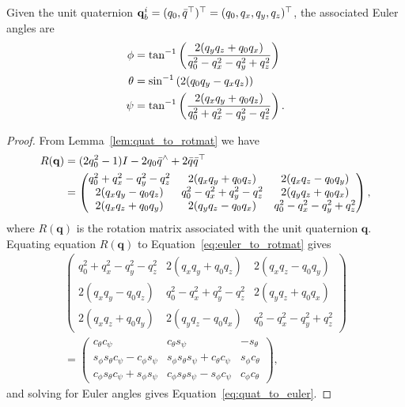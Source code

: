 \begin{lemma} \label{lem:quat_to_euler}
Given the unit quaternion $\mathbf{q}_b^i = (q_0, \bar{q}^\top)^\top = (q_0, q_x, q_y, q_z)^\top$, the associated Euler angles are
\begin{align}
\phi &= \tan^{-1}\left(\frac{2(q_yq_z+q_0q_x)}{q_0^2-q_x^2-q_y^2+q_z^2}\right) \notag \\	
\theta &= \sin^{-1}\left(2(q_0q_y-q_xq_z)\right) \label{eq:quat_to_euler} \\
\psi &= \tan^{-1}\left(\frac{2(q_xq_y+q_0q_z)}{q_0^2+q_x^2-q_y^2-q_z^2}\right). \notag
\end{align}
\end{lemma}
\begin{proof}
From Lemma~\ref{lem:quat_to_rotmat} we have
\begin{align}
R(\mathbf{q}) &= (2q_0^2-1)I-2q_0\bar{q}^\wedge + 2\bar{q}\bar{q}^\top \notag \\
&=\begin{pmatrix} 
q_0^2+q_x^2-q_y^2-q_z^2 & 2(q_x q_y+q_0 q_z) & 2(q_x q_z-q_0 q_y) \\
2(q_x q_y-q_0 q_z) & q_0^2-q_x^2+q_y^2-q_z^2 & 2(q_y q_z+q_0 q_x) \\
2(q_x q_z+q_0 q_y) & 2(q_ yq_z-q_0 q_x) & q_0^2-q_x^2-q_y^2+q_z^2
\end{pmatrix},\label{eq:quat_to_rotmat}
\end{align}
where $R(\mathbf{q})$ is the rotation matrix associated with the unit quaternion $\mathbf{q}$.
Equating equation $R(\mathbf{q})$ to Equation~\eqref{eq:euler_to_rotmat} gives
\begin{multline} \label{eq:quat_rotmat_1}
	\begin{pmatrix} 
q_0^2+q_x^2-q_y^2-q_z^2 & 2(q_x q_y+q_0 q_z) & 2(q_x q_z-q_0 q_y) \\
2(q_x q_y-q_0 q_z) & q_0^2-q_x^2+q_y^2-q_z^2 & 2(q_y q_z+q_0 q_x) \\
2(q_x q_z+q_0 q_y) & 2(q_ yq_z-q_0 q_x) & q_0^2-q_x^2-q_y^2+q_z^2
\end{pmatrix} \\ 
= \begin{pmatrix}
c_\theta c_\psi & c_\theta s_\psi & -s_\theta \\
s_\phi s_\theta c_\psi - c_\phi s_\psi & s_\phi s_\theta s_\psi+c_\theta c_\psi & s_\phi c_\theta \\
c_\phi s_\theta c_\psi+s_\phi s_\psi & c_\phi s_\theta s_\psi-s_\phi c_\psi & c_\phi c_\theta
 \end{pmatrix},
\end{multline}
and solving for Euler angles gives Equation~\eqref{eq:quat_to_euler}.
\end{proof}

